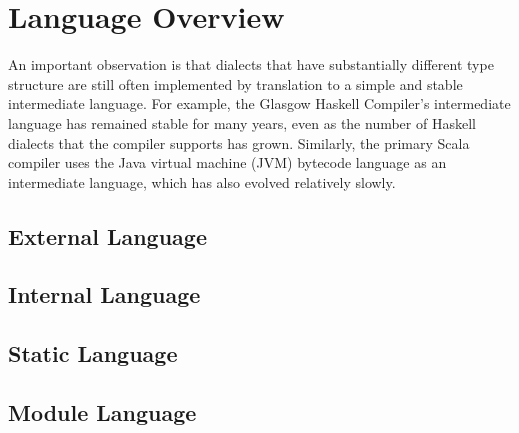 \chapter{Language Overview}\label{chap:language-overview}
An important observation is that dialects that have substantially different type structure are still often implemented by translation to a simple and stable intermediate language. For example, the Glasgow Haskell Compiler's intermediate language has remained stable for many years, even as the number of Haskell dialects that the compiler supports has grown. Similarly, the primary Scala compiler uses the Java virtual machine (JVM) bytecode language as an intermediate language, which has also evolved relatively slowly.
\section{External Language}\label{sec:EL-overview}
\section{Internal Language}\label{sec:IL-overview}
\section{Static Language}\label{sec:SL-overview}
\section{Module Language}\label{sec:ML-overview}

